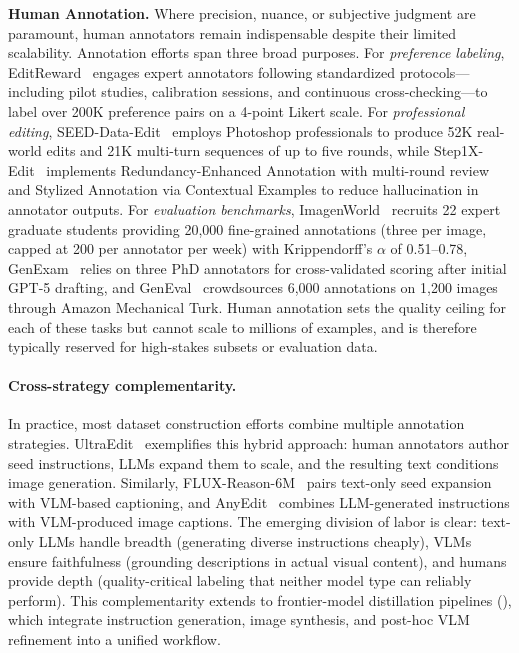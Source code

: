 \textbf{Human Annotation.}
Where precision, nuance, or subjective judgment are paramount, human annotators remain indispensable despite their limited scalability. Annotation efforts span three broad purposes. For \emph{preference labeling}, EditReward~\citep{wu2025editreward} engages expert annotators following standardized protocols---including pilot studies, calibration sessions, and continuous cross-checking---to label over 200K preference pairs on a 4-point Likert scale. For \emph{professional editing}, SEED-Data-Edit~\citep{ge2024seed} employs Photoshop professionals to produce 52K real-world edits and 21K multi-turn sequences of up to five rounds, while Step1X-Edit~\citep{liu2025step1x} implements Redundancy-Enhanced Annotation with multi-round review and Stylized Annotation via Contextual Examples to reduce hallucination in annotator outputs. For \emph{evaluation benchmarks}, ImagenWorld~\citep{sani2026imagenworld} recruits 22 expert graduate students providing 20,000 fine-grained annotations (three per image, capped at 200 per annotator per week) with Krippendorff's $\alpha$ of 0.51--0.78, GenExam~\citep{wang2025genexam} relies on three PhD annotators for cross-validated scoring after initial GPT-5 drafting, and GenEval~\citep{ghosh2023geneval} crowdsources 6,000 annotations on 1,200 images through Amazon Mechanical Turk. Human annotation sets the quality ceiling for each of these tasks but cannot scale to millions of examples, and is therefore typically reserved for high-stakes subsets or evaluation data.

\paragraph{Cross-strategy complementarity.}
In practice, most dataset construction efforts combine multiple annotation strategies. UltraEdit~\citep{zhao2024ultraedit} exemplifies this hybrid approach: human annotators author seed instructions, LLMs expand them to scale, and the resulting text conditions image generation. Similarly, FLUX-Reason-6M~\citep{fang2025flux} pairs text-only seed expansion with VLM-based captioning, and AnyEdit~\citep{yu2025anyedit} combines LLM-generated instructions with VLM-produced image captions. The emerging division of labor is clear: text-only LLMs handle breadth (generating diverse instructions cheaply), VLMs ensure faithfulness (grounding descriptions in actual visual content), and humans provide depth (quality-critical labeling that neither model type can reliably perform). This complementarity extends to frontier-model distillation pipelines (), which integrate instruction generation, image synthesis, and post-hoc VLM refinement into a unified workflow.

